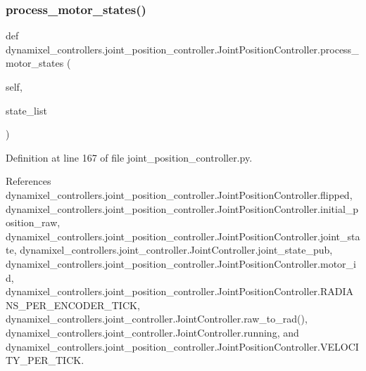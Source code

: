 \subsubsection{\texorpdfstring{process\+\_\+motor\+\_\+states()}{process\_motor\_states()}}
{\footnotesize\ttfamily def dynamixel\+\_\+controllers.\+joint\+\_\+position\+\_\+controller.\+Joint\+Position\+Controller.\+process\+\_\+motor\+\_\+states (\begin{DoxyParamCaption}\item[{}]{self,  }\item[{}]{state\+\_\+list }\end{DoxyParamCaption})}



Definition at line 167 of file joint\+\_\+position\+\_\+controller.\+py.



References dynamixel\+\_\+controllers.\+joint\+\_\+position\+\_\+controller.\+Joint\+Position\+Controller.\+flipped, dynamixel\+\_\+controllers.\+joint\+\_\+position\+\_\+controller.\+Joint\+Position\+Controller.\+initial\+\_\+position\+\_\+raw, dynamixel\+\_\+controllers.\+joint\+\_\+position\+\_\+controller.\+Joint\+Position\+Controller.\+joint\+\_\+state, dynamixel\+\_\+controllers.\+joint\+\_\+controller.\+Joint\+Controller.\+joint\+\_\+state\+\_\+pub, dynamixel\+\_\+controllers.\+joint\+\_\+position\+\_\+controller.\+Joint\+Position\+Controller.\+motor\+\_\+id, dynamixel\+\_\+controllers.\+joint\+\_\+position\+\_\+controller.\+Joint\+Position\+Controller.\+R\+A\+D\+I\+A\+N\+S\+\_\+\+P\+E\+R\+\_\+\+E\+N\+C\+O\+D\+E\+R\+\_\+\+T\+I\+CK, dynamixel\+\_\+controllers.\+joint\+\_\+controller.\+Joint\+Controller.\+raw\+\_\+to\+\_\+rad(), dynamixel\+\_\+controllers.\+joint\+\_\+controller.\+Joint\+Controller.\+running, and dynamixel\+\_\+controllers.\+joint\+\_\+position\+\_\+controller.\+Joint\+Position\+Controller.\+V\+E\+L\+O\+C\+I\+T\+Y\+\_\+\+P\+E\+R\+\_\+\+T\+I\+CK.


